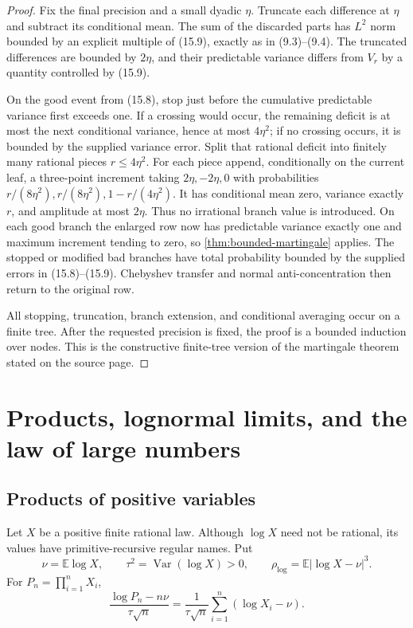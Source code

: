 \documentclass[11pt]{article}
\newcommand{\E}{\mathbb E}
\newcommand{\Var}{\operatorname{Var}}
\begin{document}
\begin{proof}
Fix the final precision and a small dyadic \(\eta\).  Truncate each difference
at \(\eta\) and subtract its conditional mean.  The sum of the discarded
parts has \(L^2\) norm bounded by an explicit multiple of (15.9), exactly as
in (9.3)--(9.4).  The truncated differences are bounded by \(2\eta\), and
their predictable variance differs from \(V_r\) by a quantity controlled by
(15.9).

On the good event from (15.8), stop just before the cumulative predictable
variance first exceeds one.  If a crossing would occur, the remaining
deficit is at most the next conditional variance, hence at most
\(4\eta^2\); if no crossing occurs, it is bounded by the supplied variance
error.  Split that rational deficit into finitely many rational pieces
\(r\le4\eta^2\).  For each piece append, conditionally on the current leaf, a
three-point increment taking \(2\eta,-2\eta,0\) with probabilities
\(r/(8\eta^2),r/(8\eta^2),1-r/(4\eta^2)\).  It has conditional mean zero,
variance exactly \(r\), and amplitude at most \(2\eta\).  Thus no irrational
branch value is introduced.  On each good branch the enlarged row now has
predictable variance exactly one and maximum increment tending to zero, so
\cref{thm:bounded-martingale} applies.  The stopped or modified bad branches
have total probability bounded by the supplied errors in (15.8)--(15.9).
Chebyshev transfer and normal anti-concentration then return to the original
row.

All stopping, truncation, branch extension, and conditional averaging occur
on a finite tree.  After the requested precision is fixed, the proof is a
bounded induction over nodes.  This is the constructive finite-tree version
of the martingale theorem stated on the source page.
\end{proof}

\section{Products, lognormal limits, and the law of large numbers}
\label{sec:products-lln}

\subsection{Products of positive variables}

Let \(X\) be a positive finite rational law.  Although \(\log X\) need not be
rational, its values have primitive-recursive regular names.  Put
\[
 \nu=\E\log X,
 \qquad \tau^2=\Var(\log X)>0,
 \qquad \rho_{\log}=\E|\log X-\nu|^3.                \tag{16.1}
\]
For \(P_n=\prod_{i=1}^nX_i\),
\[
 \frac{\log P_n-n\nu}{\tau\sqrt n}
 =\frac1{\tau\sqrt n}\sum_{i=1}^n(\log X_i-\nu).    \tag{16.2}
\]
\end{document}
